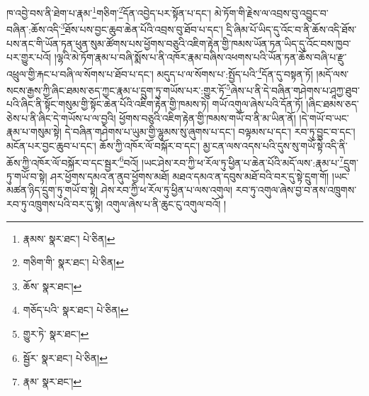 ཁ་འབྱེ་བས་ནི་ཐེག་པ་རྣམ་\footnote{རྣམས་  སྣར་ཐང་།  པེ་ཅིན། }གཅིག་\footnote{གཅིག་གི་  སྣར་ཐང་།  པེ་ཅིན། }དོན་འབྱེད་པར་སྟོན་པ་དང་། མེ་ཏོག་གི་རྗེས་ལ་འབྲས་བུ་འབྱུང་བ་བཞིན་:ཆོས་འདི་\footnote{ཆོས་  སྣར་ཐང་། }ཐོས་པས་བྱང་ཆུབ་ཆེན་པོའི་འབྲས་བུ་ཐོབ་པ་དང་། དྲི་ཞིམ་པོ་ཡིད་དུ་འོང་བ་ནི་ཆོས་འདི་ཐོས་པས་ནང་གི་ཡོན་ཏན་ཕུན་སུམ་ཚོགས་པས་ཕྱོགས་བཅུའི་འཇིག་རྟེན་གྱི་ཁམས་ཡོན་ཏན་ཡིད་དུ་འོང་བས་ཁྱབ་པར་གྱུར་པའོ། །ལྷའི་མེ་ཏོག་རྣམ་པ་བཞི་སྨོས་པ་ནི་འཁོར་རྣམ་བཞིས་འཕགས་པའི་ཡོན་ཏན་ཆོས་བཞི་པ་རྫུ་འཕྲུལ་གྱི་རྐང་པ་བཞི་ལ་སོགས་པ་ཐོབ་པ་དང་། མདུད་པ་ལ་སོགས་པ་:སྤྱོད་པའི་\footnote{གཅོད་པའི་  སྣར་ཐང་།  པེ་ཅིན། }དོན་དུ་བསྟན་ཏོ། །མདོ་ལས་སངས་རྒྱས་ཀྱི་ཞིང་ཐམས་ཅད་ཀྱང་རྣམ་པ་དྲུག་ཏུ་གཡོས་པར་:གྱུར་ཏོ་\footnote{གྱུར་ཏེ་  སྣར་ཐང་། }ཞེས་པ་ནི་དེ་བཞིན་གཤེགས་པ་ཤཱཀྱ་ཐུབ་པའི་ཞིང་ནི་སྟོང་གསུམ་གྱི་སྟོང་ཆེན་པོའི་འཇིག་རྟེན་གྱི་ཁམས་ཏེ། གཡོ་འགུལ་ཞེས་པའི་དོན་ཏོ། །ཞིང་ཐམས་ཅད་ཅེས་པ་ནི་ཞིང་དེ་གཡོས་པ་ལ་བྱའི། ཕྱོགས་བཅུའི་འཇིག་རྟེན་གྱི་ཁམས་གཡོ་བ་ནི་མ་ཡིན་ནོ། །དེ་གཡོ་བ་ཡང་རྣམ་པ་གསུམ་སྟེ། དེ་བཞིན་གཤེགས་པ་ཡུམ་གྱི་ལྷུམས་སུ་ཞུགས་པ་དང་། བལྟམས་པ་དང་། རབ་ཏུ་བྱུང་བ་དང་། མངོན་པར་བྱང་ཆུབ་པ་དང་། ཆོས་ཀྱི་འཁོར་ལོ་བསྐོར་བ་དང་། མྱ་ངན་ལས་འདས་པའི་དུས་སུ་གཡོ་སྟེ་འདི་ནི་ཆོས་ཀྱི་འཁོར་ལོ་བསྐོར་བ་དང་སྦྱར་\footnote{སྦྱོར་  སྣར་ཐང་།  པེ་ཅིན། }བའོ། །ཡང་ཤེས་རབ་ཀྱི་ཕ་རོལ་ཏུ་ཕྱིན་པ་ཆེན་པོའི་མདོ་ལས་:རྣམ་པ་\footnote{རྣམ་  སྣར་ཐང་། }དྲུག་ཏུ་གཡོ་བ་སྟེ། ཤར་ཕྱོགས་དམའ་ན་ནུབ་ཕྱོགས་མཐོ། མཐའ་དམའ་ན་དབུས་མཐོ་བའི་བར་དུ་སྟེ་དྲུག་གོ། །ཡང་མཚན་ཉིད་དྲུག་ཏུ་གཡོ་བ་སྟེ། ཤེས་རབ་ཀྱི་ཕ་རོལ་ཏུ་ཕྱིན་པ་ལས་འགུལ། རབ་ཏུ་འགུལ་ཞེས་བྱ་བ་ནས་འཁྲུགས་རབ་ཏུ་འཁྲུགས་པའི་བར་དུ་སྟེ། འགུལ་ཞེས་པ་ནི་ཆུང་ངུ་འགུལ་བའོ། །

